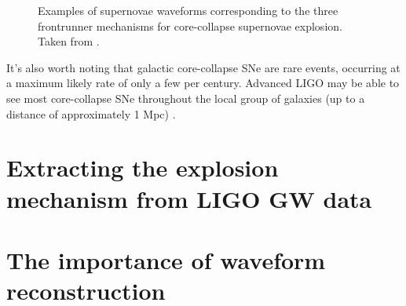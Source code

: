 \begin{figure}[htb]
	\caption{\label{fig:model_waveforms} Examples of supernovae waveforms corresponding to the three frontrunner mechanisms for core-collapse supernovae explosion. Taken from \cite{Louge}.}
\end{figure}


It's also worth noting that galactic core-collapse SNe are rare events, occurring at a maximum likely rate of only a few per century. Advanced LIGO may be able to see most core-collapse SNe throughout the local group of galaxies (up to a distance of approximately 1 Mpc) \cite{Ott-SN_GWs}. 

%
\section{Extracting the explosion mechanism from LIGO GW data} \label{MechExtract}

%
\section{The importance of waveform reconstruction} 
